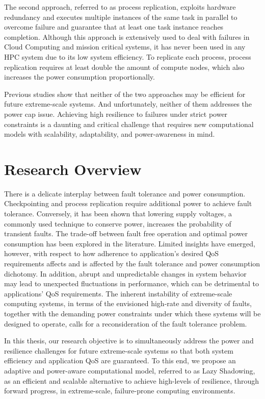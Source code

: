 The second approach, referred to as process replication, exploits hardware redundancy and executes multiple instances of the same task 
in parallel to overcome failure and guarantee that at least one task instance reaches completion. Although this approach is extensively used 
to deal with failures in 
Cloud Computing and mission critical systems, it has 
never been used in any HPC system due to its low system efficiency. To replicate each process, process replication requires 
at least double the amount of compute nodes, which also increases the power consumption proportionally. 

Previous studies show that neither of the two approaches may be efficient for future extreme-scale systems. And unfortunately, neither 
of them addresses the power cap issue. 
Achieving high resilience to failures under strict power constraints is a daunting and critical challenge that requires new 
computational models with scalability, adaptability, and power-awareness in mind. 
 
\section{Research Overview}

There is a delicate interplay between fault tolerance and power consumption. Checkpointing and process replication require 
additional power to achieve fault tolerance. Conversely, it has been shown that lowering supply voltages, a commonly used 
technique to conserve power, increases the probability of transient faults. The trade-off between fault free operation and 
optimal power consumption has been explored in the literature. Limited insights have emerged, however, with respect to how 
adherence to application's desired QoS requirements affects and is affected by the fault tolerance and power consumption 
dichotomy. In addition, abrupt and unpredictable changes in system behavior may lead to unexpected fluctuations in performance, 
which can be detrimental to applications’ QoS requirements. The inherent instability of extreme-scale computing systems, 
in terms of the envisioned high-rate and diversity of faults, together with the demanding power constraints under which 
these systems will be designed to operate, calls for a 
reconsideration of the fault tolerance problem.

In this thesis, our research objective is to simultaneously address the power and resilience challenges for future extreme-scale 
systems so that both system efficiency and application QoS are guaranteed.
To this end, we propose an adaptive and power-aware computational model, referred to as Lazy Shadowing, as an efficient and 
scalable alternative to achieve high-levels of resilience, through forward progress, in extreme-scale, failure-prone 
computing environments. 


